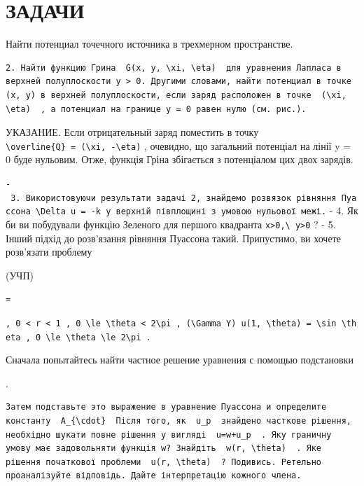 \documentclass[
  ukrainian,
]{article}
\begin{document}
\section{ЗАДАЧИ}\label{ux437ux430ux434ux430ux447ux438-5}

Найти потенциал точечного источника в трехмерном пространстве.

\begin{verbatim}
2. Найти функцию Грина  G(x, y, \xi, \eta)  для уравнения Лапласа в верхней полуплоскости y > 0. Другими словами, найти потенциал в точке (x, y) в верхней полуплоскости, если заряд расположен в точке  (\xi, \eta)  , а потенциал на границе y = 0 равен нулю (см. рис.).
\end{verbatim}

УКАЗАНИЕ. Если отрицательный заряд поместить в точку
\texttt{\textbackslash{}overline\{Q\}\ =\ (\textbackslash{}xi,\ -\textbackslash{}eta)}
, очевидно, що загальний потенціал на лінії y = 0 буде нульовим. Отже,
функція Гріна збігається з потенціалом цих двох зарядів.

\texttt{-\ 3.\ Використовуючи\ результати\ задачі\ 2,\ знайдемо\ розв\textquotesingle{}язок\ рівняння\ Пуассона\ \textquotesingle{}\textbackslash{}Delta\ u\ =\ -k\textquotesingle{}\ у\ верхній\ півплощині\ з\ умовою\ нульової\ межі.}
- 4. Як би ви побудували функцію Зеленого для першого квадранта
\texttt{x\textgreater{}0,\textbackslash{}\ y\textgreater{}0} ? - 5.
Інший підхід до розв'язання рівняння Пуассона такий. Припустимо, ви
хочете розв'язати проблему

(УЧП)

\begin{verbatim}
=
\end{verbatim}

\texttt{,\ \textquotesingle{}0\ \textless{}\ r\ \textless{}\ 1\textquotesingle{}\ ,\ \textquotesingle{}0\ \textbackslash{}le\ \textbackslash{}theta\ \textless{}\ 2\textbackslash{}pi\textquotesingle{}\ ,\ \textquotesingle{}(\textbackslash{}Gamma\ Y)\textquotesingle{}\ \textquotesingle{}u(1,\ \textbackslash{}theta)\ =\ \textbackslash{}sin\ \textbackslash{}theta\textquotesingle{}\ ,\ \textquotesingle{}0\ \textbackslash{}le\ \textbackslash{}theta\ \textbackslash{}le\ 2\textbackslash{}pi\textquotesingle{}\ .}

Сначала попытайтесь найти частное решение уравнения с помощью
подстановки

.

\begin{verbatim}
Затем подставьте это выражение в уравнение Пуассона и определите константу  A_{\cdot}  Після того, як  u_p  знайдено часткове рішення, необхідно шукати повне рішення у вигляді  u=w+u_p  . Яку граничну умову має задовольняти функція w? Знайдіть  w(r, \theta)  . Яке рішення початкової проблеми  u(r, \theta)  ? Подивись. Ретельно проаналізуйте відповідь. Дайте інтерпретацію кожного члена.
\end{verbatim}
\end{document}
